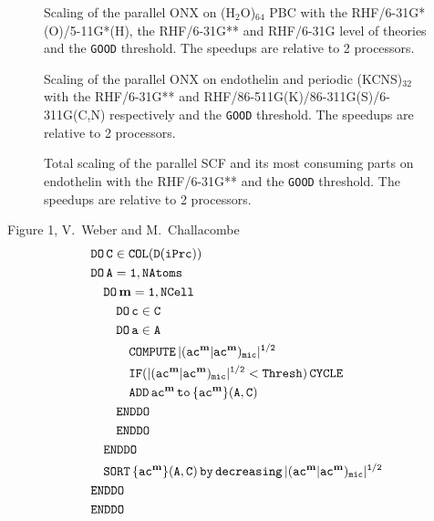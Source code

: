 \documentclass[prl,preprint,doublespace]{revtex4} %
\begin{document}
{\begin{figure}[h]
  \caption{\protect
    Scaling of the parallel ONX on (H$_2$O)$_{64}$ PBC with the RHF/6-31G*(O)/5-11G*(H),
    the RHF/6-31G** and RHF/6-31G level of theories and the {\tt GOOD} threshold.
    The speedups are relative to 2 processors.
  }\label{fig:h2o_pbc_64}

  \caption{\protect
    Scaling of the parallel ONX on endothelin and periodic (KCNS)$_{32}$ with
    the RHF/6-31G** and RHF/86-511G(K)/86-311G(S)/6-311G(C,N)
    respectively and the {\tt GOOD} threshold.
    The speedups are relative to 2 processors.
  }\label{fig:Endothelin_KCNS}

  \caption{\protect
    Total scaling of the parallel SCF and its most consuming parts
    on endothelin with the RHF/6-31G**
    and the {\tt GOOD} threshold.
    The speedups are relative to 2 processors.
  }\label{fig:EndothelinTotalTiming}

\end{figure}

\clearpage

\begin{center}
Figure 1, V.~Weber and M.~Challacombe \\[1.cm]
  \begin{equation*}
    \begin{split}
      &\tt          DO\,C\in COL(D(iPrc))\\
      &\tt          DO\,A=1,NAtoms\\
      &\tt\quad       DO\,\mathbf{m}=1,NCell\\
      &\tt\qquad        DO\,c\in C\\
      &\tt\qquad        DO\,a\in A\\
      &\tt\qquad\quad     COMPUTE\,|(ac^\mathbf{m}|ac^\mathbf{m})_{mic}|^{1/2}\\
      &\tt\qquad\quad     IF(|(ac^\mathbf{m}|ac^\mathbf{m})_{mic}|^{1/2}<{\tt Thresh)\,CYCLE}\\
      &\tt\qquad\quad     ADD\,ac^\mathbf{m}\,{\tt to}\, \{ac^\mathbf{m}\}(A,C)\\
      &\tt\qquad        ENDDO\\
      &\tt\qquad        ENDDO\\
      &\tt\quad       ENDDO\\
      &\tt\quad       SORT\,\{ac^\mathbf{m}\}(A,C)\,by\,decreasing\,|(ac^\mathbf{m}|ac^\mathbf{m})_{mic}|^{1/2}\\
      &\tt         ENDDO\\
      &\tt         ENDDO
    \end{split}
  \end{equation*}
\end{center}

}
\end{document}
